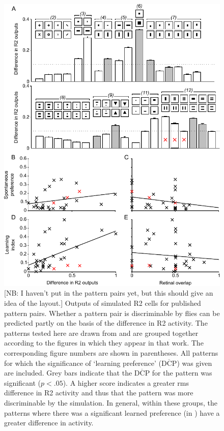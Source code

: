 \begin{figure}
\centering
\includegraphics{figures/pattern}
\caption{[NB: I haven't put in the pattern pairs yet, but this should give an idea of the layout.]
Outputs of simulated R2 cells for published pattern pairs. Whether a pattern pair is discriminable by flies can be predicted partly on the basis of the difference in R2 activity.
The patterns tested here are drawn from \protect\cite{Ernst1999} and are grouped together according to the figures in which they appear in that work.
The corresponding figure numbers are shown in parentheses.
All patterns for which the significance of `learning preference' ($\overline{\mathrm{DCP}}$) was given are included.
Grey bars indicate that the $\overline{\mathrm{DCP}}$ for the pattern was significant ($p<.05$).
A higher score indicates a greater \ac{rms} difference in R2 activity and thus that the pattern was more discriminable by the simulation.
In general, within these groups, the patterns where there was a significant learned preference (in \protect\cite{Ernst1999}) have a greater difference in activity.
}
\end{figure}
